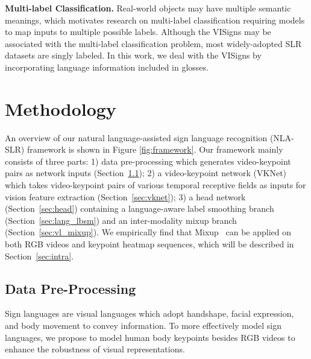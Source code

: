 \documentclass[10pt,twocolumn,letterpaper]{article}
\begin{document}
\noindent\textbf{Multi-label Classification.} Real-world objects may have multiple semantic meanings, which motivates research on multi-label classification \cite{ridnik2021asymmetric, ke2022hyperspherical, zhang2013review, rajeswar2022multi, kim2022large} requiring models to map inputs to multiple possible labels.
Although the VISigns may be associated with the multi-label classification problem, most widely-adopted SLR datasets \cite{li2020word, joze2019ms, hu2021global} are singly labeled.
In this work, we deal with the VISigns by incorporating language information included in glosses. \section{Methodology}
An overview of our natural language-assisted sign language recognition (NLA-SLR) framework is shown in Figure \ref{fig:framework}. Our framework mainly consists of three parts: 1) data pre-processing which generates video-keypoint pairs as network inputs (Section~\ref{sec:data}); 2) a video-keypoint network (VKNet) which takes video-keypoint pairs of various temporal receptive fields as inputs for vision feature extraction (Section~\ref{sec:vknet}); 3) a head network (Section~\ref{sec:head}) containing a language-aware label smoothing branch (Section~\ref{sec:lang_lbsm}) and an inter-modality mixup branch (Section~\ref{sec:vl_mixup}). We empirically find that Mixup~\cite{zhang2018mixup} can be applied on both RGB videos and keypoint heatmap sequences, which will be described in Section~\ref{sec:intra}.


\subsection{Data Pre-Processing}
\label{sec:data}
Sign languages are visual languages which adopt handshape, facial expression, and body movement to convey information.
To more effectively model sign languages, we propose to model human body keypoints besides RGB videos to enhance the robustness of visual representations. 
\end{document}
